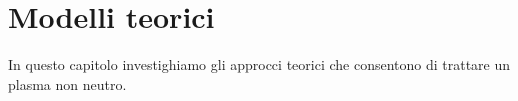 \chapter{Modelli teorici}

In questo capitolo investighiamo gli approcci teorici che consentono di trattare un plasma non neutro.

